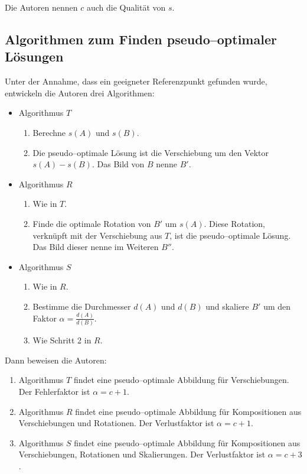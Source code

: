 Die Autoren nennen $c$ auch die Qualität von $s$.

\subsection{Algorithmen zum Finden pseudo--optimaler Lösungen}

Unter der Annahme, dass ein geeigneter Referenzpunkt gefunden wurde, entwickeln die Autoren drei Algorithmen:
\begin{itemize}
\item Algorithmus $T$
\begin{enumerate}
\item Berechne $s(A)$ und $s(B)$.
\item Die pseudo--optimale Lösung ist die Verschiebung um den Vektor $s(A)-s(B)$. Das Bild von $B$ nenne $B'$.
\end{enumerate}

\item Algorithmus $R$
\begin{enumerate}
\item Wie in $T$.
\item Finde die optimale Rotation von $B'$ um $s(A)$. Diese Rotation, verknüpft mit der Verschiebung aus $T$, ist die pseudo--optimale Lösung. Das Bild dieser nenne im Weiteren $B''$.

\end{enumerate}
\item Algorithmus $S$
\begin{enumerate}
\item Wie in $R$.
\item Bestimme die Durchmesser $d(A)$ und $d(B)$ und skaliere $B'$ um den Faktor $\alpha =\frac{d(A)}{d(B)}$.
\item Wie Schritt 2 in $R$.
\end{enumerate}
\end{itemize}

Dann beweisen die Autoren:
\begin{enumerate}
\item Algorithmus $T$ findet eine pseudo--optimale Abbildung für Verschiebungen. Der Fehlerfaktor ist $\alpha=c+1$.
\item Algorithmus $R$ findet eine pseudo--optimale Abbildung für Kompositionen aus Verschiebungen und Rotationen.  Der Verlustfaktor ist $\alpha=c+1$.
\item Algorithmus $S$ findet eine pseudo--optimale Abbildung für Kompositionen aus Verschiebungen, Rotationen und Skalierungen. Der Verlustfaktor ist $\alpha=c+3$.
\end{enumerate}


